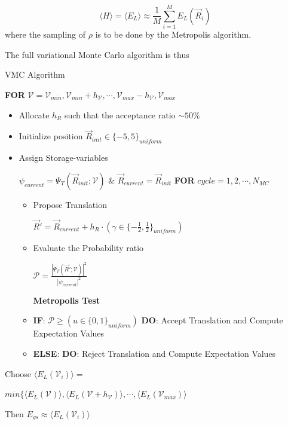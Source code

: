 \documentclass[aip,nobalancelastpage,
twocolumn,
rsi,%
 amsmath,amssymb,
 reprint,%
]{revtex4}
\begin{document}
\begin{equation}
\langle H\rangle =\langle E_L\rangle \approx \frac{1}{M} \sum_{i=1}^M E_L(\vec{R}_i) 
\end{equation}
where the sampling of $\rho$ is to be done by the Metropolis algorithm. \par



The full variational Monte Carlo algorithm is thus

\begin{algorithm}[H]
\caption{VMC Algorithm}
\label{VMCAlgorithm}
\begin{algorithmic}[1]
\State \textbf{FOR} $\mathcal{V} = \mathcal{V}_{min}, \mathcal{V}_{min}+h_\mathcal{V},\cdots, \mathcal{V}_{max} - h_\mathcal{V}, \mathcal{V}_{max}$
	\begin{itemize}
    \item Allocate $h_R$ such that the acceptance ratio $\sim 50\%$
    \item Initialize position $\vec{R}_{init}\in\{-5,5\}_{uniform}$
	\item Assign Storage-variables \par $\psi_{current}=\Psi_{T}(\vec{R}_{init};\mathcal{V})$  \&  $\vec{R}_{current} = \vec{R}_{init}$
   \State \textbf{FOR} $cycle = 1,2,\cdots , N_{MC}$
   \begin{itemize}
   \item Propose Translation \par
    $\vec{R}' = \vec{R}_{current} + h_R \cdot \left( \gamma \in \{-\frac{1}{2}, \frac{1}{2}\}_{uniform}\right)$
   \item Evaluate the Probability ratio \par
    $\mathcal{P}=\frac{\left|\Psi_T\left(\vec{R}';\mathcal{V}\right)\right|^2}{\left|\psi_{current}\right|^2}$\par
	\textbf{Metropolis Test}
   \item[] \textbf{IF}: $\mathcal{P}\geq \left(u \in \{0,1\}_{uniform}\right)$ \textbf{DO}: Accept Translation and Compute Expectation Values
   \item[] \textbf{ELSE}: \textbf{DO}: Reject Translation and Compute Expectation Values
   \end{itemize}
\end{itemize}
\State Choose $\langle E_L\left(\mathcal{V}_i\right)\rangle =$\par 
\small
$min\{\langle E_L\left(\mathcal{V}\right)\rangle, \langle E_L\left(\mathcal{V} + h_\mathcal{V}\right)\rangle,\cdots, \langle E_L\left(\mathcal{V}_{max}\right)\rangle$
\normalsize \par

\State Then $E_{gs} \approx \langle E_L\left(\mathcal{V}_i\right)\rangle$
   \end{algorithmic}
\end{algorithm}
\end{document}
